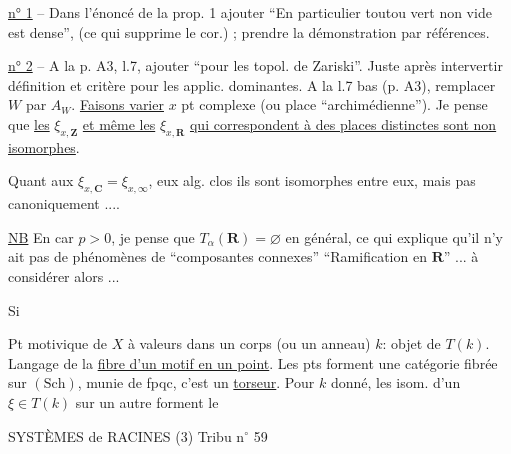 \uline{n° 1} -- Dans l'énoncé de la prop. 1 ajouter ``En particulier toutou vert non vide est dense'', (ce qui supprime le cor.) ; prendre la démonstration par références.

\uline{n° 2} -- A la p. A3, l.7, ajouter ``pour les topol. de Zariski''. Juste après intervertir définition et critère pour les applic. dominantes. A la l.7 bas (p. A3), remplacer $W$ par $A_W$.
\uline{Faisons varier} $x$ pt complexe (ou place ``archimédienne''). Je pense que \uline{les}
$\xi_{x,\mathbf Z}$ \uline{et même les} $\xi_{x,\mathbf R}$ 
\uline{qui correspondent à des places distinctes sont non isomorphes}.


Quant aux $\xi_{x,\mathbf C}=\xi_{x,\infty}$, eux 
alg. clos ils sont isomorphes entre eux, mais pas canoniquement ....

\uline{NB} En car $p>0$, je pense que $T_\alpha(\mathbf R)=\varnothing$
en général, ce qui explique qu'il n'y ait pas de phénomènes de
``composantes connexes'' ``Ramification en $\mathbf R$'' ...
à considérer alors ...


Si


Pt motivique de $X$ à valeurs dans un corps (ou un anneau) $k$: objet de $T(k)$.
Langage de la \uline{fibre d'un motif en un point}.
Les pts forment une catégorie fibrée sur $(\mathrm{Sch})$, munie de fpqc,
 c'est un \uline{torseur}.
Pour $k$ donné, les isom. d'un  $\xi\in T(k)$ sur un autre forment le

SYSTÈMES de RACINES (3) \hfill Tribu n$^\circ$ 59

